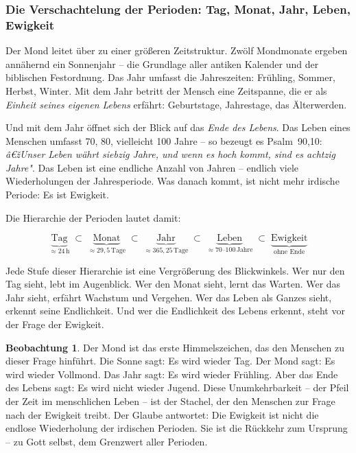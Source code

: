﻿\documentclass[a4paper,12pt]{article}
\theoremstyle{definition}
\newtheorem{observation}{Beobachtung}[section]
\begin{document}
\subsubsection{Die Verschachtelung der Perioden: Tag, Monat, Jahr, Leben, Ewigkeit}

Der Mond leitet über zu einer größeren Zeitstruktur. Zwölf Mondmonate ergeben
annähernd ein Sonnenjahr -- die Grundlage aller antiken Kalender und der
biblischen Festordnung. Das Jahr umfasst die Jahreszeiten: Frühling, Sommer,
Herbst, Winter. Mit dem Jahr betritt der Mensch eine Zeitspanne, die er als
\textit{Einheit seines eigenen Lebens} erfährt: Geburtstage, Jahrestage, das
Älterwerden.

Und mit dem Jahr öffnet sich der Blick auf das \textit{Ende des Lebens}. Das
Leben eines Menschen umfasst 70, 80, vielleicht 100 Jahre -- so bezeugt es
Psalm~90,10: \textit{â€žUnser Leben währt siebzig Jahre, und wenn es hoch kommt,
	sind es achtzig Jahre"}. Das Leben ist eine endliche Anzahl von Jahren -- endlich
viele Wiederholungen der Jahresperiode. Was danach kommt, ist nicht mehr irdische
Periode: Es ist Ewigkeit.

Die Hierarchie der Perioden lautet damit:

\begin{equation}
	\underbrace{\text{Tag}}_{\approx 24\,\text{h}}
	\;\subset\;
	\underbrace{\text{Monat}}_{\approx 29{,}5\,\text{Tage}}
	\;\subset\;
	\underbrace{\text{Jahr}}_{\approx 365{,}25\,\text{Tage}}
	\;\subset\;
	\underbrace{\text{Leben}}_{\approx 70\text{--}100\,\text{Jahre}}
	\;\subset\;
	\underbrace{\text{Ewigkeit}}_{\text{ohne Ende}}
\end{equation}

Jede Stufe dieser Hierarchie ist eine Vergrößerung des Blickwinkels. Wer nur den
Tag sieht, lebt im Augenblick. Wer den Monat sieht, lernt das Warten. Wer das
Jahr sieht, erfährt Wachstum und Vergehen. Wer das Leben als Ganzes sieht,
erkennt seine Endlichkeit. Und wer die Endlichkeit des Lebens erkennt, steht vor
der Frage der Ewigkeit.

\begin{observation}
	Der Mond ist das erste Himmelszeichen, das den Menschen zu dieser Frage
	hinführt. Die Sonne sagt: Es wird wieder Tag. Der Mond sagt: Es wird wieder
	Vollmond. Das Jahr sagt: Es wird wieder Frühling. Aber das Ende des Lebens
	sagt: Es wird nicht wieder Jugend. Diese Unumkehrbarkeit -- der Pfeil der Zeit
	im menschlichen Leben -- ist der Stachel, der den Menschen zur Frage nach der
	Ewigkeit treibt. Der Glaube antwortet: Die Ewigkeit ist nicht die endlose
	Wiederholung der irdischen Perioden. Sie ist die Rückkehr zum Ursprung -- zu
	Gott selbst, dem Grenzwert aller Perioden.
\end{observation}
\end{document}

